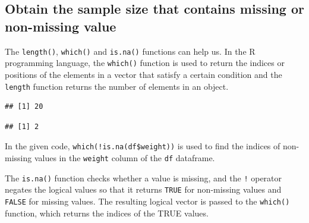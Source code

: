 \documentclass[
]{article}
\newenvironment{Shaded}{\begin{snugshade}}{\end{snugshade}}
\newcommand{\CommentTok}[1]{\textcolor[rgb]{0.56,0.35,0.01}{\textit{#1}}}
\newcommand{\FunctionTok}[1]{\textcolor[rgb]{0.13,0.29,0.53}{\textbf{#1}}}
\newcommand{\NormalTok}[1]{#1}
\newcommand{\SpecialCharTok}[1]{\textcolor[rgb]{0.81,0.36,0.00}{\textbf{#1}}}
\begin{document}
\hypertarget{obtain-the-sample-size-that-contains-missing-or-non-missing-value}{%
\subsection{Obtain the sample size that contains missing or non-missing
value}\label{obtain-the-sample-size-that-contains-missing-or-non-missing-value}}

The \texttt{length()}, \texttt{which()} and \texttt{is.na()} functions
can help us. In the R programming language, the \texttt{which()}
function is used to return the indices or positions of the elements in a
vector that satisfy a certain condition and the \texttt{length} function
returns the number of elements in an object.

\begin{Shaded}
\end{Shaded}

\begin{verbatim}
## [1] 20
\end{verbatim}

\begin{Shaded}
\end{Shaded}

\begin{verbatim}
## [1] 2
\end{verbatim}

In the given code, \texttt{which(!is.na(df\$weight))} is used to find
the indices of non-missing values in the \texttt{weight} column of the
\texttt{df} dataframe.

The \texttt{is.na()} function checks whether a value is missing, and the
\texttt{!} operator negates the logical values so that it returns
\texttt{TRUE} for non-missing values and \texttt{FALSE} for missing
values. The resulting logical vector is passed to the \texttt{which()}
function, which returns the indices of the TRUE values.
\end{document}
